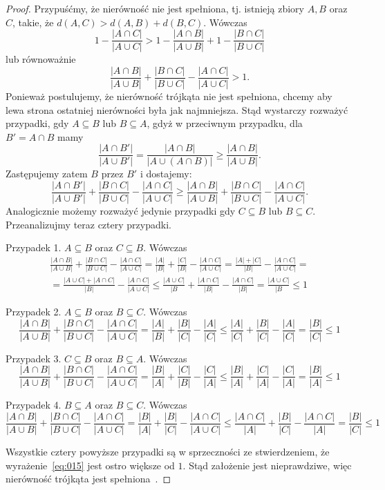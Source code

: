 \documentclass{praca1}
\begin{document}
\begin{proof}
Przypuśćmy, że nierówność nie jest spełniona, tj. istnieją zbiory $A, B$ oraz $C$, takie, że $ d(A, C) > d(A,B) + d(B, C)$. Wówczas
$$
1 - \frac{|A\cap C|}{|A\cup C|} > 1 - \frac{|A\cap B|}{|A\cup B|} + 1 - \frac{|B\cap C|}{|B\cup C|}
$$
lub równoważnie
\begin{equation}
\label{eq:015}
\frac{|A\cap B|}{|A\cup B|} + \frac{|B\cap C|}{|B\cup C|} - \frac{|A\cap C|}{|A\cup C|} > 1.
\end{equation}
Ponieważ postulujemy, że nierówność trójkąta nie jest spełniona, chcemy aby lewa strona ostatniej nierówności była jak najmniejsza. Stąd wystarczy rozważyć przypadki, gdy $A \subseteq B$ lub $B \subseteq A$, gdyż w przeciwnym przypadku, dla $B' = A\cap B$ mamy
$$
\frac{|A\cap B'|}{|A\cup B'|} = \frac{|A\cap B|}{|A\cup (A \cap B)|} \geq \frac{|A\cap B|}{|A\cup B|}.
$$
Zastępujemy zatem $B$ przez $B'$ i dostajemy:
$$
\frac{|A\cap B'|}{|A\cup B'|} + \frac{|B\cap C|}{|B\cup C|} - \frac{|A\cap C|}{|A\cup C|} \geq \frac{|A\cap B|}{|A\cup B|} + \frac{|B\cap C|}{|B\cup C|} - \frac{|A\cap C|}{|A\cup C|}.
$$
Analogicznie możemy rozważyć jedynie przypadki gdy $C \subseteq B$ lub $B \subseteq C$. Przeanalizujmy teraz cztery przypadki.

Przypadek 1. $A\subseteq B$ oraz $C \subseteq B$. Wówczas
\begin{multline*}
\frac{|A\cap B|}{|A\cup B|} + \frac{|B\cap C|}{|B\cup C|} - \frac{|A\cap C|}{|A\cup C|} = 
\frac{|A|}{|B|} + \frac{|C|}{|B|} - \frac{|A\cap C|}{|A\cup C|} =
\frac{|A| + |C|}{|B|} - \frac{|A\cap C|}{|A\cup C|} =\\
= \frac{|A\cup C| + |A\cap C|}{|B|} - \frac{|A\cap C|}{|A\cup C|} \leq 
\frac{|A\cup C|}{|B} + \frac{|A\cap C|}{|B|} - \frac{|A\cap C|}{|B|} = 
\frac{|A\cup C|}{|B}  \leq 1
\end{multline*}

Przypadek 2. $A\subseteq B$ oraz $B \subseteq C$. Wówczas
$$
\frac{|A\cap B|}{|A\cup B|} + \frac{|B\cap C|}{|B\cup C|} - \frac{|A\cap C|}{|A\cup C|} = 
\frac{|A|}{|B|} + \frac{|B|}{|C|} - \frac{|A|}{|C|} \leq 
\frac{|A|}{|C|} + \frac{|B|}{|C|} - \frac{|A|}{|C|} = 
\frac{|B|}{|C|} \leq 1
$$

Przypadek 3. $C\subseteq B$ oraz $B \subseteq A$. Wówczas
$$
\frac{|A\cap B|}{|A\cup B|} + \frac{|B\cap C|}{|B\cup C|} - \frac{|A\cap C|}{|A\cup C|} = 
\frac{|B|}{|A|} + \frac{|C|}{|B|} - \frac{|C|}{|A|} \leq 
\frac{|B|}{|A|} + \frac{|C|}{|A|} - \frac{|C|}{|A|} =
\frac{|B|}{|A|} \leq 1
$$

Przypadek 4. $B\subseteq A$ oraz $B \subseteq C$. Wówczas
$$
\frac{|A\cap B|}{|A\cup B|} + \frac{|B\cap C|}{|B\cup C|} - \frac{|A\cap C|}{|A\cup C|} = 
\frac{|B|}{|A|} + \frac{|B|}{|C|} - \frac{|A\cap C|}{|A\cup C|} \leq 
\frac{|A \cap C|}{|A|} + \frac{|B|}{|C|} - \frac{|A\cap C|}{|A|} =
\frac{|B|}{|C|} \leq 1
$$

Wszystkie cztery powyższe przypadki są w sprzeczności ze stwierdzeniem, że wyrażenie~\ref{eq:015} jest ostro większe od $1$. Stąd założenie jest nieprawdziwe, więc nierówność trójkąta jest spełniona~\cite{Wilbik2012:distance}.
\end{proof}
\end{document}

